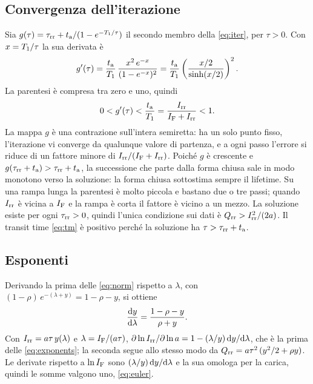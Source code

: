 \documentclass[10pt,a4paper]{scrartcl}
\let\newcommand\lmitdefine
\newcommand{\IF}{I_\mathrm{F}}
\newcommand{\Irr}{I_\mathrm{rr}}
\newcommand{\Qrr}{Q_\mathrm{rr}}
\newcommand{\ta}{t_\mathrm{a}}
\newcommand{\taurr}{\tau_\mathrm{rr}}
\newcommand{\Tone}{T_1}
\newcommand{\diff}{\mathrm{d}}
\begin{document}
\subsection{Convergenza dell'iterazione}
\label{app:contraction}
Sia $g(\tau) = \taurr + \ta/(1-e^{-\Tone/\tau})$ il secondo membro della \eqref{eq:iter}, per $\tau > 0$. Con $x = \Tone/\tau$ la sua derivata è
\begin{equation}
g'(\tau) = \frac{\ta}{\Tone}\,\frac{x^2\,e^{-x}}{(1-e^{-x})^2} = \frac{\ta}{\Tone}\left(\frac{x/2}{\sinh(x/2)}\right)^{2} .
\end{equation}
La parentesi è compresa tra zero e uno, quindi
\begin{equation}
0 < g'(\tau) < \frac{\ta}{\Tone} = \frac{\Irr}{\IF+\Irr} < 1 .
\end{equation}
La mappa $g$ è una contrazione sull'intera semiretta: ha un solo punto fisso, l'iterazione vi converge da qualunque valore di partenza, e a ogni passo l'errore si riduce di un fattore minore di $\Irr/(\IF+\Irr)$. Poiché $g$ è crescente e $g(\taurr+\ta) > \taurr+\ta$, la successione che parte dalla forma chiusa sale in modo monotono verso la soluzione: la forma chiusa sottostima sempre il lifetime. Su una rampa lunga la parentesi è molto piccola e bastano due o tre passi; quando $\Irr$ è vicina a $\IF$ e la rampa è corta il fattore è vicino a un mezzo. La soluzione esiste per ogni $\taurr > 0$, quindi l'unica condizione sui dati è $\Qrr > \Irr^2/(2a)$. Il transit time \eqref{eq:tm} è positivo perché la soluzione ha $\tau > \taurr + \ta$.

\subsection{Esponenti}
\label{app:exponents}
Derivando la prima delle \eqref{eq:norm} rispetto a $\lambda$, con $(1-\rho)\,e^{-(\lambda+y)} = 1-\rho-y$, si ottiene
\begin{equation}
\frac{\diff y}{\diff\lambda} = \frac{1-\rho-y}{\rho+y} .
\end{equation}
Con $\Irr = a\tau\,y(\lambda)$ e $\lambda = \IF/(a\tau)$, $\partial\ln\Irr/\partial\ln a = 1 - (\lambda/y)\,\diff y/\diff\lambda$, che è la prima delle \eqref{eq:exponents}; la seconda segue allo stesso modo da $\Qrr = a\tau^2\,(y^2/2+\rho y)$. Le derivate rispetto a $\ln\IF$ sono $(\lambda/y)\,\diff y/\diff\lambda$ e la sua omologa per la carica, quindi le somme valgono uno, \eqref{eq:euler}.

\end{document}
